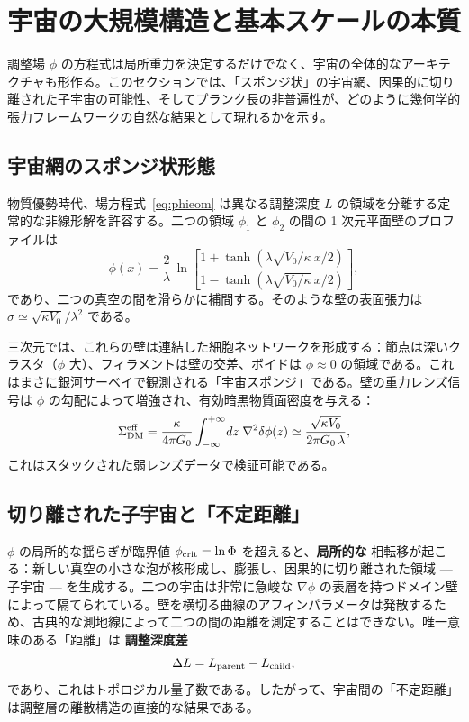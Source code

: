 \documentclass[12pt,a4paper]{article}
\begin{document}
	\section{宇宙の大規模構造と基本スケールの本質}
	\label{sec:sponge}
	
	調整場 \(\phi\) の方程式は局所重力を決定するだけでなく、宇宙の全体的なアーキテクチャも形作る。このセクションでは、「スポンジ状」の宇宙網、因果的に切り離された子宇宙の可能性、そしてプランク長の非普遍性が、どのように幾何学的張力フレームワークの自然な結果として現れるかを示す。
	
	\subsection{宇宙網のスポンジ状形態}
	物質優勢時代、場方程式~\eqref{eq:phieom} は異なる調整深度 \(L\) の領域を分離する定常的な非線形解を許容する。二つの領域 \(\phi_1\) と \(\phi_2\) の間の 1 次元平面壁のプロファイルは
	\begin{equation}
		\phi(x) = \frac{2}{\lambda}\,\ln\!\left[
		\frac{1 + \tanh(\lambda\sqrt{V_0/\kappa}\, x/2)}
		{1 - \tanh(\lambda\sqrt{V_0/\kappa}\, x/2)}
		\right],
		\label{eq:domain-wall}
	\end{equation}
	であり、二つの真空の間を滑らかに補間する。そのような壁の表面張力は \(\sigma \simeq \sqrt{\kappa V_0}/\lambda^2\) である。
	
	三次元では、これらの壁は連結した細胞ネットワークを形成する：節点は深いクラスタ（\(\phi\) 大）、フィラメントは壁の交差、ボイドは \(\phi \approx 0\) の領域である。これはまさに銀河サーベイで観測される「宇宙スポンジ」である。壁の重力レンズ信号は \(\phi\) の勾配によって増強され、有効暗黒物質面密度を与える：
	\begin{equation}
		\Sigma_{\rm DM}^{\rm eff} = \frac{\kappa}{4\pi G_0} \int_{-\infty}^{+\infty} \!dz\; \nabla^2\delta\phi(z)
		\simeq \frac{\sqrt{\kappa V_0}}{2\pi G_0\,\lambda},
		\label{eq:wall-lensing}
	\end{equation}
	これはスタックされた弱レンズデータで検証可能である。
	
	\subsection{切り離された子宇宙と「不定距離」}
	\(\phi\) の局所的な揺らぎが臨界値 \(\phi_{\rm crit}=\ln\Phi\) を超えると、\textbf{局所的な} 相転移が起こる：新しい真空の小さな泡が核形成し、膨張し、因果的に切り離された領域 — 子宇宙 — を生成する。二つの宇宙は非常に急峻な \(\nabla\phi\) の表層を持つドメイン壁によって隔てられている。壁を横切る曲線のアフィンパラメータは発散するため、古典的な測地線によって二つの間の距離を測定することはできない。唯一意味のある「距離」は \textbf{調整深度差}
	\begin{equation}
		\Delta L = L_{\rm parent} - L_{\rm child},
		\label{eq:deltaL}
	\end{equation}
	であり、これはトポロジカル量子数である。したがって、宇宙間の「不定距離」は調整層の離散構造の直接的な結果である。
	
\end{document}
